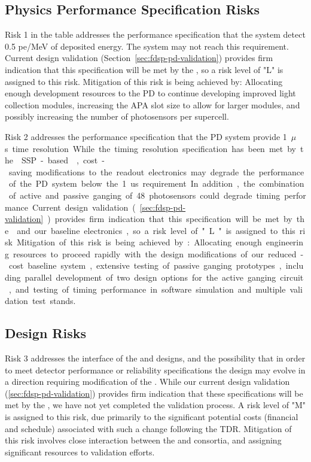 \subsection{Physics Performance Specification Risks}

Risk 1 in the table addresses the performance specification that the  system detect 0.5 pe/MeV of deposited energy.  The system may not reach this requirement.  Current design validation (Section~\ref{sec:fdsp-pd-validation}) 
 provides firm indication that this specification will be met by the , so a risk level of "L" is assigned to this risk.  Mitigation of this risk is being achieved by:  Allocating enough development resources to the PD to continue developing improved light collection modules, increasing the APA slot size to allow for larger modules, and possibly increasing the number of photosensors per  supercell.

Risk 2 addresses the performance specification that the PD system provide \SI{1}{$\mu$s} time resolution.  While the timing resolution specification has been met by the  SSP-based ,  cost-saving modifications to the readout electronics may degrade the performance of the PD system below the 1 us requirement.  In addition, the combination of active and passive ganging of 48 photosensors could degrade timing performance.  Current design validation (\ref{sec:fdsp-pd-validation}) provides firm indication that this specification will be met by the  and our baseline electronics, so a risk level of "L" is assigned to this risk.  Mitigation of this risk is being achieved by:  Allocating enough engineering resources to proceed rapidly with the design modifications of our reduced-cost baseline system, extensive testing of passive ganging prototypes, including parallel development of two design options for the active ganging circuit, and testing of timing performance in software simulation and multiple validation test stands.


\subsection{Design Risks}

Risk 3 addresses the interface of the  and  designs, and the possibility that in order to meet detector performance or reliability specifications the  design may evolve in a direction requiring modification of the .  While our current design validation (\ref{sec:fdsp-pd-validation}) provides firm indication that these specifications will be met by the , we have not yet completed the validation process.  A risk level of "M" is assigned to this risk, due primarily to the significant potential costs (financial and schedule) associated with such a change following the TDR.  Mitigation of this risk involves close interaction between the  and  consortia, and assigning significant resources to  validation efforts.

